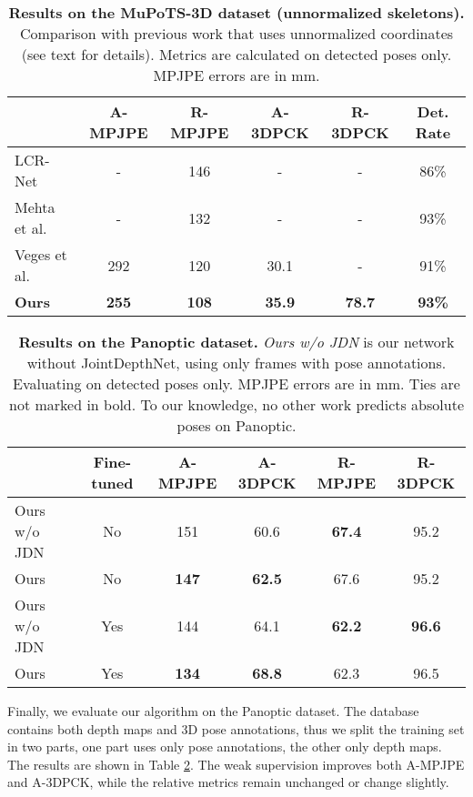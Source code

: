 \documentclass[runningheads]{llncs}
\begin{document}
\begin{table}[h]
\caption{\textbf{Results on the MuPoTS-3D dataset (unnormalized skeletons).} Comparison with previous work that uses unnormalized coordinates (see text for details). Metrics are calculated on detected poses only. MPJPE errors are in mm. }\label{tbl:mupots-normal}
\begin{center}
\begin{tabular}{lccccc}
 & A-MPJPE  & R-MPJPE  &  A-3DPCK   & R-3DPCK  & Det. Rate    \\
\hline
LCR-Net \cite{rogez2017lcrnet} & - & 146  & - & - & 86\% \\
Mehta et al. \cite{mehta2018single_shot} & - & 132  & - & - & 93\% \\ 
Veges et al. \cite{veges2019depthpose} & 292 & 120  & 30.1 & - & 91\% \\
\hline
\textbf{Ours} & \textbf{255} & \textbf{108}  & \textbf{35.9} & \textbf{78.7} & \textbf{93\%} \\
\hline
\end{tabular}
\end{center}
\end{table}

\begin{table}[h]
\caption{\textbf{Results on the Panoptic dataset.} \emph{Ours w/o JDN} is our network without JointDepthNet, using only frames with pose annotations. Evaluating on detected poses only. MPJPE errors are in mm. Ties are not marked in bold. To our knowledge, no other work predicts absolute poses on Panoptic. }
\label{tbl:panoptic}
\begin{center}
\begin{tabular}{lccccc}
\hline
 & Fine-tuned & A-MPJPE  & A-3DPCK  & R-MPJPE  & R-3DPCK    \\
\hline
Ours w/o JDN & No & 151 & 60.6  & \textbf{67.4} & 95.2  \\  Ours & No & \textbf{147} & \textbf{62.5} & 67.6 & 95.2  \\ \hline
Ours w/o JDN & Yes & 144 & 64.1 & \textbf{62.2} & \textbf{96.6}  \\  Ours & Yes & \textbf{134} & \textbf{68.8}  & 62.3 & 96.5   \\ \hline
\end{tabular}
\end{center}
\end{table}

Finally, we evaluate our algorithm on the Panoptic dataset. The database contains both depth maps and 3D pose annotations, thus we split the training set in two parts, one part uses only pose annotations, the other only depth maps. The results are shown in Table \ref{tbl:panoptic}. The weak supervision improves both A\nobreakdash-MPJPE and A\nobreakdash-3DPCK, while the relative metrics remain unchanged or change slightly.
\end{document}
